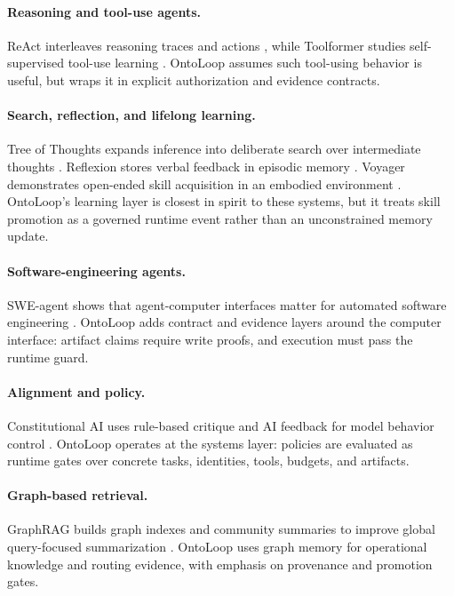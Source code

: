 \documentclass[11pt]{article}
\begin{document}
\paragraph{Reasoning and tool-use agents.}
ReAct interleaves reasoning traces and actions \cite{yao2022react}, while
Toolformer studies self-supervised tool-use learning \cite{schick2023toolformer}.
OntoLoop assumes such tool-using behavior is useful, but wraps it in explicit
authorization and evidence contracts.

\paragraph{Search, reflection, and lifelong learning.}
Tree of Thoughts expands inference into deliberate search over intermediate
thoughts \cite{yao2023tot}. Reflexion stores verbal feedback in episodic memory
\cite{shinn2023reflexion}. Voyager demonstrates open-ended skill acquisition in an
embodied environment \cite{wang2023voyager}. OntoLoop's learning layer is closest
in spirit to these systems, but it treats skill promotion as a governed runtime
event rather than an unconstrained memory update.

\paragraph{Software-engineering agents.}
SWE-agent shows that agent-computer interfaces matter for automated software
engineering \cite{yang2024sweagent}. OntoLoop adds contract and evidence layers
around the computer interface: artifact claims require write proofs, and execution
must pass the runtime guard.

\paragraph{Alignment and policy.}
Constitutional AI uses rule-based critique and AI feedback for model behavior
control \cite{bai2022constitutional}. OntoLoop operates at the systems layer:
policies are evaluated as runtime gates over concrete tasks, identities, tools,
budgets, and artifacts.

\paragraph{Graph-based retrieval.}
GraphRAG builds graph indexes and community summaries to improve global
query-focused summarization \cite{edge2024graphrag}. OntoLoop uses graph memory
for operational knowledge and routing evidence, with emphasis on provenance and
promotion gates.
\end{document}
